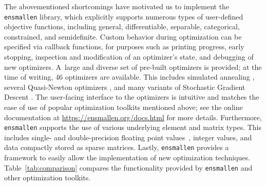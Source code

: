 \documentclass[twoside,11pt]{article}
\begin{document}
The abovementioned shortcomings have motivated us to implement the {\tt ensmallen} library,
which explicitly supports numerous types of user-defined objective functions,
including general, differentiable, separable, categorical, constrained, and semidefinite.
Custom behavior during optimization can be specified via {callback} functions,
for purposes such as printing progress, early stopping, inspection and modification of an optimizer's state,
and debugging of new optimizers.
A~large and diverse set of pre-built optimizers is provided;
at the time of writing, 46 optimizers are available.
This includes 
simulated annealing \citep{kirkpatrick1983optimization},
several Quasi-Newton optimizers \citep{liu1989limited,mokhtari2018},
and many variants of Stochastic Gradient Descent \citep{Ruder_2016}.
The user-facing interface to the optimizers is intuitive
and matches the ease of use of popular
optimization toolkits mentioned above;
see the online documentation at \mbox{\url{https://ensmallen.org/docs.html}} for more details.
Furthermore, {\tt ensmallen} supports the use of various underlying element and matrix types.
This includes single- and double-precision floating point values~\citep{Goldberg_CSUR_1991}, 
integer values, and data compactly stored as sparse matrices.
Lastly, {\tt ensmallen} provides a framework to easily allow the implementation of new optimization techniques.
Table~\ref{tab:comparison} compares the functionality provided
by {\tt ensmallen} and other optimization toolkits.
\end{document}
